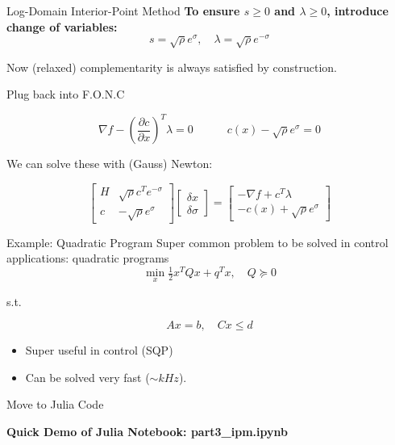 \begin{frame}{Log-Domain Interior-Point Method}
\textbf{To ensure $s \geq 0$ and $\lambda \geq 0$, introduce change of variables:} $$s = \sqrt{\rho} e^{\sigma}, \quad \lambda = \sqrt{\rho} e^{-\sigma}$$

Now (relaxed) complementarity is always satisfied by construction.

Plug back into F.O.N.C

$$
\nabla f - \left(\frac{\partial c}{\partial x}\right)^T \lambda = 0 \quad \quad \quad c(x) - \sqrt{\rho} e^{\sigma} = 0
$$

We can solve these with (Gauss) Newton:

$$
\begin{bmatrix}
H & \sqrt{\rho} c^T e^{-\sigma} \\
c & -\sqrt{\rho} e^{\sigma}
\end{bmatrix}
\begin{bmatrix}
\delta x \\ \delta \sigma
\end{bmatrix}
=
\begin{bmatrix}
-\nabla f + c^T \lambda \\ -c(x) + \sqrt{\rho} e^{\sigma}
\end{bmatrix}
$$



\end{frame}


\begin{frame}{Example: Quadratic Program}
Super common problem to be solved in control applications: quadratic programs
$$
\min_x \tfrac{1}{2} x^T Q x + q^T x, \quad Q \succeq 0
$$

s.t.

$$
Ax = b, \quad Cx \leq d
$$

\begin{itemize}
    \item Super useful in control (SQP)
    \item Can be solved very fast ($\sim kHz$).
\end{itemize} 
\end{frame}



\begin{frame}{Move to Julia Code}
\begin{center}
    \textbf{Quick Demo of Julia Notebook: part3\_ipm.ipynb}
\end{center}
\end{frame}


